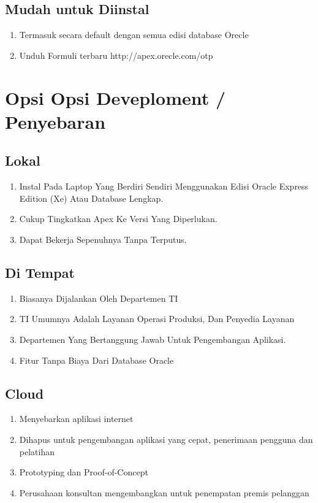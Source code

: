 \documentclass[a4paper,12pt]{report}
\begin{document}
\subsection{Mudah untuk Diinstal}
\begin{enumerate}
    \item Termasuk secara default dengan semua edisi database Orecle
    \item Unduh Formuli terbaru http://apex.orecle.com/otp
\end{enumerate}

\section{Opsi Opsi Deveploment / Penyebaran}
\subsection{Lokal}
\begin{enumerate}
    \item 	Instal Pada Laptop Yang Berdiri Sendiri Menggunakan Edisi Oracle Express Edition (Xe) Atau Database Lengkap.
    \item Cukup Tingkatkan Apex Ke Versi Yang Diperlukan.
    \item Dapat Bekerja Sepenuhnya Tanpa Terputus.
\end{enumerate}
\subsection{Di Tempat}
\begin{enumerate}
    \item Biasanya Dijalankan Oleh Departemen TI
    \item TI Umumnya Adalah Layanan Operasi Produksi, Dan Penyedia Layanan
    \item Departemen Yang Bertanggung Jawab Untuk Pengembangan Aplikasi.
    \item Fitur Tanpa Biaya Dari Database Oracle
\end{enumerate}
\subsection{Cloud}
\begin{enumerate}
    \item Menyebarkan aplikasi internet
    \item  Dihapus untuk pengembangan aplikasi yang cepat, penerimaan pengguna dan pelatihan
    \item Prototyping dan Proof-of-Concept
    \item Perusahaan konsultan mengembangkan untuk penempatan premis pelanggan
\end{enumerate}
\end{document}
